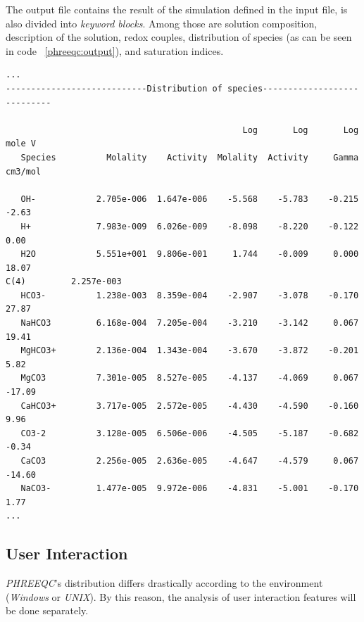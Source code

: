 The output file contains the result of the simulation defined in the input file, is also divided into \emph{keyword blocks}. Among those are solution composition, description of the solution, redox couples, distribution of species (as can be seen in code ~\ref{phreeqc:output}), and saturation indices.

\begin{minipage}[c]{0.92\textwidth}
\begin{lstlisting}[frame=single, caption=\emph{PHREEQC}'s excerpt from the output file, label=phreeqc:output]
...
----------------------------Distribution of species----------------------------
 
                                               Log       Log       Log    mole V
   Species          Molality    Activity  Molality  Activity     Gamma   cm3/mol
 
   OH-            2.705e-006  1.647e-006    -5.568    -5.783    -0.215     -2.63
   H+             7.983e-009  6.026e-009    -8.098    -8.220    -0.122      0.00
   H2O            5.551e+001  9.806e-001     1.744    -0.009     0.000     18.07
C(4)         2.257e-003
   HCO3-          1.238e-003  8.359e-004    -2.907    -3.078    -0.170     27.87
   NaHCO3         6.168e-004  7.205e-004    -3.210    -3.142     0.067     19.41
   MgHCO3+        2.136e-004  1.343e-004    -3.670    -3.872    -0.201      5.82
   MgCO3          7.301e-005  8.527e-005    -4.137    -4.069     0.067    -17.09
   CaHCO3+        3.717e-005  2.572e-005    -4.430    -4.590    -0.160      9.96
   CO3-2          3.128e-005  6.506e-006    -4.505    -5.187    -0.682     -0.34
   CaCO3          2.256e-005  2.636e-005    -4.647    -4.579     0.067    -14.60
   NaCO3-         1.477e-005  9.972e-006    -4.831    -5.001    -0.170      1.77
...
\end{lstlisting}
\end{minipage}

\subsection{User Interaction}
\emph{PHREEQC}'s distribution differs drastically according to the environment (\emph{Windows} or \emph{UNIX}). By this reason, the analysis of user interaction features will be done separately.

